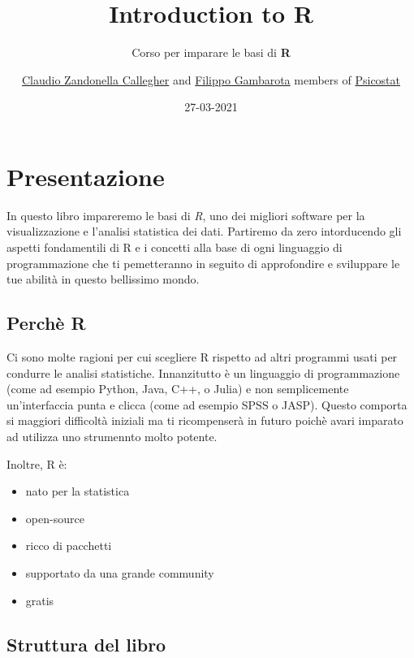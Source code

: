 \documentclass[
]{book}
\title{{Introduction to R}}
\subtitle{Corso per imparare le basi di \textbf{R}}
\author{\href{https://claudiozandonella.netlify.app/}{Claudio Zandonella Callegher} and \href{https://filippogambarota.netlify.app/}{Filippo Gambarota} members of \href{https://psicostat.dpss.psy.unipd.it/}{Psicostat}}
\date{27-03-2021}
\providecommand{\tightlist}{%
  \setlength{\itemsep}{0pt}\setlength{\parskip}{0pt}}
\begin{document}
\maketitle

{
\setcounter{tocdepth}{1}
\tableofcontents
}
\hypertarget{presentazione}{%
\chapter*{Presentazione}\label{presentazione}}

In questo libro impareremo le basi di \emph{R}, uno dei migliori software per la visualizzazione e l'analisi statistica dei dati. Partiremo da zero intorducendo gli aspetti fondamentili di R e i concetti alla base di ogni linguaggio di programmazione che ti pemetteranno in seguito di approfondire e sviluppare le tue abilità in questo bellissimo mondo.

\hypertarget{perchuxe8-r}{%
\section*{Perchè R}\label{perchuxe8-r}}

Ci sono molte ragioni per cui scegliere R rispetto ad altri programmi usati per condurre le analisi statistiche. Innanzitutto è un linguaggio di programmazione (come ad esempio Python, Java, C++, o Julia) e non semplicemente un'interfaccia punta e clicca (come ad esempio SPSS o JASP). Questo comporta si maggiori difficoltà iniziali ma ti ricompenserà in futuro poichè avari imparato ad utilizza uno strumennto molto potente.

Inoltre, R è:

\begin{itemize}
\tightlist
\item
  nato per la statistica
\item
  open-source
\item
  ricco di pacchetti
\item
  supportato da una grande community
\item
  gratis
\end{itemize}

\hypertarget{struttura-del-libro}{%
\section*{Struttura del libro}\label{struttura-del-libro}}
\end{document}
